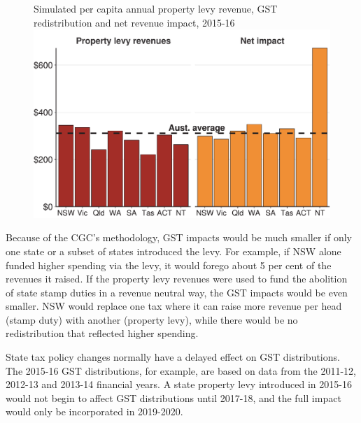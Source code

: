 \begin{figure}
%
{Simulated per capita annual property levy revenue, GST redistribution and net revenue impact, 2015-16}%
\includegraphics[width=\columnwidth]{Property-taxes/atlas/figure/Figure7-1.pdf}

\end{figure}

Because of the CGC’s methodology, GST impacts would be much smaller if only one state or a subset of states introduced the levy. For example, if NSW alone funded higher spending via the levy, it would forego about 5 per cent of the revenues it raised. If the property levy revenues were used to fund the abolition of state stamp duties in a revenue neutral way, the GST impacts would be even smaller. NSW would replace one tax where it can raise more revenue per head (stamp duty) with another (property levy), while there would be no redistribution that reflected higher spending.  

State tax policy changes normally have a delayed effect on GST distributions. The 2015-16 GST distributions, for example, are based on data from the 2011-12, 2012-13 and 2013-14 financial years. A state property levy introduced in 2015-16 would not begin to affect GST distributions until 2017-18, and the full impact would only be incorporated in 2019-2020. 

